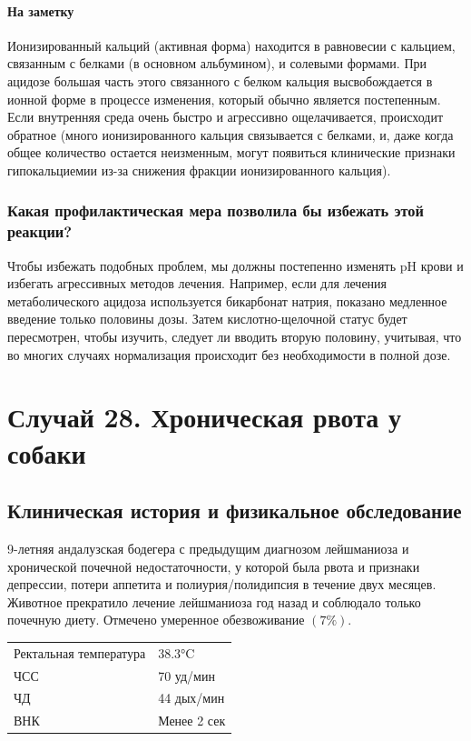 \documentclass[a4paper,12pt]{book}
\begin{document}
\paragraph{На заметку}
Ионизированный кальций (активная форма) находится в равновесии с кальцием, связанным с белками (в основном альбумином), и солевыми формами. При ацидозе большая часть этого связанного с белком кальция высвобождается в ионной форме в процессе изменения, который обычно является постепенным. Если внутренняя среда очень быстро и агрессивно ощелачивается, происходит обратное (много ионизированного кальция связывается с белками, и, даже когда общее количество остается неизменным, могут появиться клинические признаки гипокальциемии из-за снижения фракции ионизированного кальция).

\subsubsection*{Какая профилактическая мера позволила бы избежать этой реакции?}
Чтобы избежать подобных проблем, мы должны постепенно изменять pH крови и избегать агрессивных методов лечения. Например, если для лечения метаболического ацидоза используется бикарбонат натрия, показано медленное введение только половины дозы. Затем кислотно-щелочной статус будет пересмотрен, чтобы изучить, следует ли вводить вторую половину, учитывая, что во многих случаях нормализация происходит без необходимости в полной дозе.

\section{Случай 28. Хроническая рвота у собаки}
\subsection*{Клиническая история и физикальное обследование}
9-летняя андалузская бодегера с предыдущим диагнозом лейшманиоза и хронической почечной недостаточности, у которой была рвота и признаки депрессии, потери аппетита и полиурия/полидипсия в течение двух месяцев. Животное прекратило лечение лейшманиоза год назад и соблюдало только почечную диету. Отмечено умеренное обезвоживание $(7\%)$.

\begin{tabular}{@{}ll@{}}
\toprule
Ректальная температура & 38.3°C \\
ЧСС & 70 уд/мин \\
ЧД & 44 дых/мин \\
ВНК & Менее 2 сек \\
\bottomrule
\end{tabular}
\end{document}
